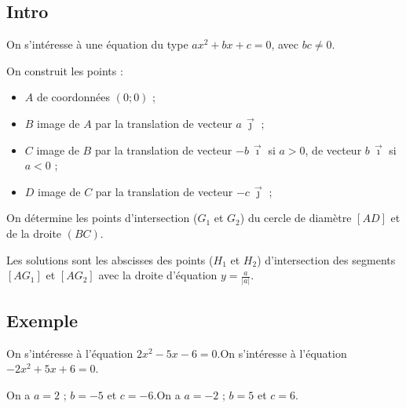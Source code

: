 %
%
%
%

\subsection{Intro}

\noindent On s'intéresse à une équation du type $ax^2+bx+c=0$, avec $bc \neq 0$.

\noindent On construit les points :

\begin{itemize}
	\item $A$ de coordonnées $(0;0)$ ;
	\item $B$ image de $A$ par la translation de vecteur $a\,\vec{\jmath}$ ;
	\item $C$ image de $B$ par la translation de vecteur $-b\,\vec{\imath}$ si $a>0$, de vecteur $b\,\vec{\imath}$ si $a<0$ ;
	\item $D$ image de $C$ par la translation de vecteur $-c\,\vec{\jmath}$ ;
\end{itemize}

\noindent On détermine les points d'intersection ($G_1$ et $G_2$) du cercle de diamètre $[AD]$ et de la droite $(BC)$.

\noindent Les solutions sont les abscisses des points ($H_1$ et $H_2$) d'intersection des segments $[AG_1]$ et $[AG_2]$ avec la droite d'équation $y=\frac{a}{|a|}$.

\subsection{Exemple}

\noindent On s'intéresse à l'équation $2x^2-5x-6=0$.\hfill On s'intéresse à l'équation $-2x^2+5x+6=0$.

\noindent On a $a=2$ ; $b=-5$ et $c=-6$.\hfill On a $a=-2$ ; $b=5$ et $c=6$.

